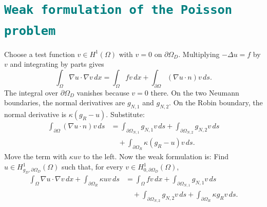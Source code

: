 \documentclass[12pt,a4paper]{article}
\begin{document}
\section*{\textcolor{teal}{\texttt{Weak formulation of the Poisson problem}}}
Choose a test function $v \in H^1(\Omega)$ with $v=0$ on
$\partial\Omega_D$. Multiplying $-\Delta u=f$ by $v$ and
integrating by parts gives
\[
    \int_\Omega \nabla u \cdot \nabla v \, dx
    = \int_\Omega fv \, dx
    + \int_{\partial\Omega} (\nabla u \cdot n)v \, ds.\]
The integral over $\partial\Omega_D$ vanishes because $v=0$ there.
On the two Neumann boundaries, the normal derivatives are $g_{N,1}$
and $g_{N,2}$. On the Robin boundary, the normal derivative is
$\kappa(g_R-u)$. Substitute:
\[\begin{aligned}
    \int_{\partial\Omega} (\nabla u \cdot n)v \, ds
    &= \int_{\partial\Omega_{N,1}} g_{N,1}v \, ds
     + \int_{\partial\Omega_{N,2}} g_{N,2}v \, ds \\
    &\quad + \int_{\partial\Omega_R} \kappa(g_R-u)v \, ds.
\end{aligned}\]
Move the term with $\kappa uv$ to the left.
Now the weak formulation is: Find $u \in H^1_{g_D,\partial\Omega_D}(\Omega)$
such that, for every $v \in H^1_{0,\partial\Omega_D}(\Omega)$,
\[\begin{aligned}
    \int_\Omega \nabla u \cdot \nabla v \, dx
    + \int_{\partial\Omega_R} \kappa uv \, ds
    &= \int_\Omega fv \, dx
     + \int_{\partial\Omega_{N,1}} g_{N,1}v \, ds \\
    &\quad + \int_{\partial\Omega_{N,2}} g_{N,2}v \, ds
     + \int_{\partial\Omega_R} \kappa g_Rv \, ds.
\end{aligned}\]
\end{document}
